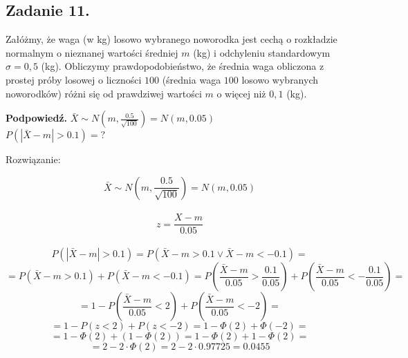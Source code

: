 \subsection{Zadanie 11.}
Załóżmy, że waga (w kg) losowo wybranego noworodka jest cechą o rozkładzie normalnym o nieznanej wartości średniej $m$ (kg) i odchyleniu standardowym $\sigma = 0,5$ (kg). Obliczymy prawdopodobieństwo, że średnia waga obliczona z prostej próby losowej o liczności $100$ (średnia waga $100$ losowo wybranych noworodków) różni się od prawdziwej wartości $m$ o więcej niż $0,1$ (kg).

\textbf{ Podpowiedź.}
$\bar X \sim N(m,\frac{0.5}{\sqrt{100}}) = N(m,0.05)$\\
$ P( | \bar X - m | > 0.1 )  = ? $ %

Rozwiązanie:

$$ \bar X \sim N( m, \frac{0.5}{ \sqrt{100} } ) = N( m, 0.05 ) $$ \\
$$ z = \frac{X - m}{0.05} $$ \\

$$ P( | \bar X - m | > 0.1 ) = P( \bar X - m > 0.1 \vee \bar X - m < -0.1 ) = $$
$$ = P( \bar X - m > 0.1 ) + P( \bar X - m < -0.1 ) = P( \frac{ \bar X - m}{0.05} > \frac{0.1}{0.05} ) + P(  \frac{ \bar X - m}{0.05} < - \frac{0.1}{0.05} ) = $$
$$ = 1 -  P( \frac{\bar X - m}{0.05} < 2 ) + P( \frac{\bar X - m}{0.05} < -2 ) = $$
$$ = 1 -  P( z < 2 ) + P( z < -2 ) = 1 - \Phi(2) + \Phi(-2) = $$
$$ = 1 - \Phi(2) + ( 1 - \Phi(2) ) = 1 - \Phi(2) + 1 - \Phi(2) = $$
$$ = 2 - 2 \cdot \Phi(2) = 2 - 2 \cdot 0.97725 = 0.0455 $$
